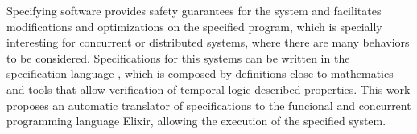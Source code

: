 Specifying software provides safety guarantees for the system and
facilitates modifications and optimizations on the specified program, which is specially interesting for concurrent or distributed systems, where there are many behaviors to be considered. Specifications for this systems can be written in the specification language \TLAA, which is composed by definitions close to mathematics and tools that allow verification of temporal logic described properties. This work proposes an automatic translator of \TLA specifications to the funcional and concurrent programming language Elixir, allowing the execution of the specified system.
